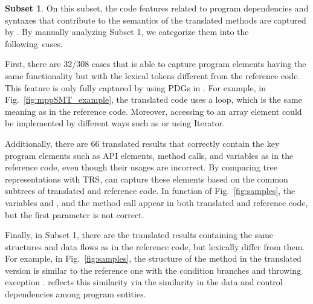 

\textbf{Subset 1}. On this subset, the code features related to
program dependencies and syntaxes that contribute to the semantics of
the translated methods are captured by {\model}. By manually analyzing
Subset 1, we categorize them into the following~cases.

First, there are 32/308 cases that {\model} is able to capture program
elements having the same functionality but with the lexical tokens
different from the reference code. This feature is only fully captured
by using PDGs in {\model}. For example, in
Fig.~\ref{fig:mppSMT_example}, the translated code uses a 
loop, which is the same meaning as  in the reference
code. Moreover, accessing to an array element could be implemented by
different ways such as  or using Iterator.
%

Additionally, there are 66 translated results that correctly contain
the key program elements such as API elements, method calls, and
variables as in the reference code, even though their usages are
incorrect. By comparing tree representations with TRS, {\model} can
capture these elements based on the common subtrees of translated and
reference code. In function  of
Fig.~\ref{fig:samples}, the variables  and
, and the method call  appear in
both translated and reference code, but the first parameter is not correct.
%

Finally, in Subset 1, there are the translated results containing the
same structures and data flows as in the reference code, but lexically
differ from them. For example, in Fig.~\ref{fig:samples}, the
structure of the method  in the translated version is
similar to the reference one with the condition branches  and
throwing exception . {\model} reflects
this similarity via the similarity in the data and control
dependencies among program entities.


